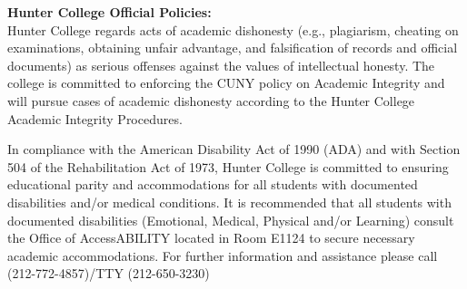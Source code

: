 \documentclass[a4paper]{article}
\begin{document}
\textbf{Hunter College Official Policies:}\\
Hunter College regards acts of academic dishonesty (e.g., plagiarism, cheating on examinations, obtaining
unfair advantage, and falsification of records and official documents) as serious offenses against the values of
intellectual honesty. The college is committed to enforcing the CUNY policy on Academic Integrity and will
pursue cases of academic dishonesty according to the Hunter College Academic Integrity Procedures.
\par In compliance with the American Disability Act of 1990 (ADA) and with Section 504 of the Rehabilitation
Act of 1973, Hunter College is committed to ensuring educational parity and accommodations for all students
with documented disabilities and/or medical conditions. It is recommended that all students with documented
disabilities (Emotional, Medical, Physical and/or Learning) consult the Office of AccessABILITY located in
Room E1124 to secure necessary academic accommodations. For further information and assistance please call
(212-772-4857)/TTY (212-650-3230)
\end{document}

